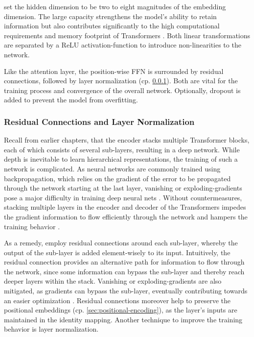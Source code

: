 \textcite[][6009]{vaswaniAttentionAllYou2017} set the hidden dimension to be two to eight magnitudes of the embedding dimension. The large capacity strengthens the model's ability to retain information but also contributes significantly to the high computational requirements and memory footprint of Transformers \autocites[][4--5]{tayEfficientTransformersSurvey2022}[][1]{kitaevReformerEfficientTransformer2020}. Both linear transformations are separated by a \gls{ReLU} \gls{activation-function} \autocite[][318]{glorotDeepSparseRectifier2011} to introduce non-linearities to the network.

Like the attention layer, the position-wise \gls{FFN} is surrounded by residual connections, followed by layer normalization (cp. \cref{sec:residual-connections-layer-norm}). Both are vital for the training process and convergence of the overall network. Optionally, dropout is added to prevent the model from \gls{overfitting}.

\subsubsection{Residual Connections and Layer Normalization}\label{sec:residual-connections-layer-norm}

Recall from earlier chapters, that the encoder stacks multiple Transformer blocks, each of which consists of several sub-layers, resulting in a deep network. While depth is inevitable to learn hierarchical representations, the training of such a network is complicated. As neural networks are commonly trained using backpropagation, which relies on the gradient of the error to be propagated through the network starting at the last layer, vanishing or \glspl{exploding-gradient} pose a major difficulty in training deep neural nets \autocite[][1]{heDeepResidualLearning2015}. Without countermeasures, stacking multiple layers in the encoder and decoder of the Transformers impedes the gradient information to flow efficiently through the network and hampers the training behavior \autocite[][1811]{wangLearningDeepTransformer2019}.

As a remedy, \textcite[][6003]{vaswaniAttentionAllYou2017} employ residual connections around each sub-layer, whereby the output of the sub-layer is added element-wisely to its input. Intuitively, the residual connection provides an alternative path for information to flow through the network, since some information can bypass the sub-layer and thereby reach deeper layers within the stack. Vanishing or \glspl{exploding-gradient} are also mitigated, as gradients can bypass the sub-layer, eventually contributing towards an easier optimization \autocite[][3591]{liuRethinkingSkipConnection2020}. Residual connections moreover help to preserve the positional embeddings (cp. \cref{sec:positional-encoding}), as the layer's inputs are maintained in the identity mapping. Another technique to improve the training behavior is layer normalization.

